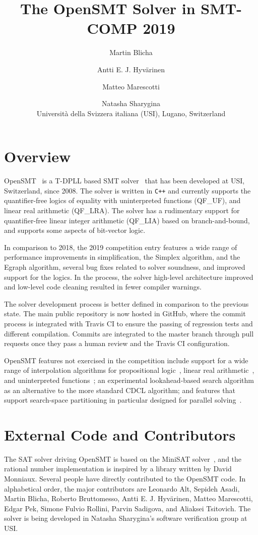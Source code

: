 \documentclass{article}
\title{The OpenSMT Solver in SMT-COMP 2019}
\author{
Martin Blicha \and 
Antti E. J. Hyv{\"a}rinen \and
Matteo Marescotti \and
Natasha Sharygina \\
{\small Universit{\`a} della Svizzera italiana (USI), Lugano,
Switzerland}
}
\date{}
\begin{document}
\maketitle

\section{Overview}

OpenSMT~\cite{HyvarinenMAS16} is a T-DPLL based SMT
solver~\cite{NieuwenhuisOT:JACM06} that has been developed at USI,
Switzerland, since 2008.  The solver is written in {\tt C++} and
currently supports the quantifier-free logics of equality with
uninterpreted functions (QF\_UF), and linear real arithmetic (QF\_LRA).
The solver has a rudimentary support for quantifier-free linear integer
arithmetic (QF\_LIA) based on branch-and-bound, and supports some
aspects of bit-vector logic.

In comparison to 2018, the 2019 competition entry features a wide range
of performance improvements in simplification, the Simplex algorithm,
and the Egraph algorithm, several bug fixes related to solver soundness,
and improved support for the logics.  In the process, the solver
high-level architecture improved and low-level code cleaning resulted in
fewer compiler warnings.

The solver development process is better defined in comparison to the
previous state.  The main public repository
 is now
hosted in GitHub, where the commit process is integrated with Travis CI
to ensure the passing of regression tests and different compilation.
Commits are integrated to the master branch through pull requests once
they pass a human review and the Travis CI configuration.

OpenSMT features not exercised in the competition include support for a
wide range of interpolation algorithms for propositional
logic~\cite{AltFHS:VSTTE2015}, linear real
arithmetic~\cite{BlichaHKS19}, and uninterpreted
functions~\cite{AltHAS:FMCAD17}; an experimental look\-ahead-based
search algorithm~\cite{HyvarinenMSCS18} as an alternative to the more
standard CDCL algorithm; and features that support search-space
partitioning in particular designed for parallel
solving~\cite{HyvarinenMS:SAT15}.

\section{External Code and Contributors}

The SAT solver driving OpenSMT is based on the MiniSAT
solver~\cite{EenS:SAT03}, and the rational number implementation is
inspired by a library written by David Monniaux.  Several people have
directly contributed to the OpenSMT code.  In alphabetical order, the
major contributors are
%
Leonardo Alt,
Sepideh Asadi,
Martin Blicha,
Roberto Bruttomesso,
Antti E. J. Hyv{\"a}rinen,
Matteo Marescotti,
Edgar Pek,
Simone Fulvio Rollini,
Parvin Sadigova, and
Aliaksei Tsitovich.
%
The solver is being developed in Natasha Sharygina's software
verification group at USI.
\end{document}

